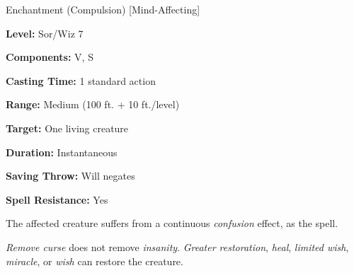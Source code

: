 
Enchantment (Compulsion) [Mind-Affecting]

\textbf{Level:} Sor/Wiz 7

\textbf{Components:} V, S

\textbf{Casting Time:} 1 standard action

\textbf{Range:} Medium (100 ft. + 10 ft./level)

\textbf{Target:} One living creature

\textbf{Duration:} Instantaneous

\textbf{Saving Throw:} Will negates

\textbf{Spell Resistance:} Yes

The affected creature suffers from a continuous \textit{confusion} effect, as the 
spell.

\textit{Remove curse} does not remove \textit{insanity}. \textit{Greater restoration}, 
\textit{heal}, \textit{limited wish}, \textit{miracle}, or \textit{wish} can restore 
the creature.

